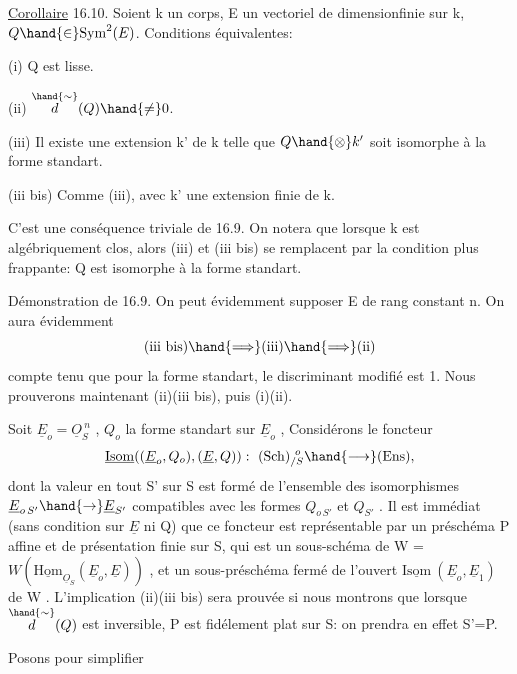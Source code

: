 \uline{Corollaire} 16.10. Soient k un corps, E un vectoriel de dimensionfinie
sur k, $Q \hand{\in} \mathrm{Sym}^2(E)$. Conditions équivalentes:

(i) Q est lisse.

(ii) $\overset{\hand{\sim}}{d}(Q) \hand{\neq} 0$.

(iii) Il existe une extension  k' de k telle que $Q\hand{\otimes} k'$ soit
isomorphe à la forme standart.

(iii bis) Comme (iii), avec k' une extension finie de k.

C'est une conséquence triviale de 16.9. On notera que lorsque k est
algébriquement clos, alors (iii) et (iii bis) se remplacent par la
condition plus frappante: Q est isomorphe à la forme standart.

Démonstration de 16.9. On  peut évidemment
supposer E de rang constant n. On aura évidemment
\[ \text{(iii bis)} \hand{\Longrightarrow} \text{(iii)} \hand{\Longrightarrow} \text{(ii)} \]
compte tenu que pour la forme standart, le discriminant modifié est 1.
Nous prouverons maintenant (ii)\hand{$\Longrightarrow$}(iii bis), puis (i)\hand{$\Longleftrightarrow$}(ii).

Soit $\underline{E}_o = \underline{O}_S^{\ n}$ , $Q_o$ la forme standart sur $\underline{E}_o$ , Considérons le
foncteur
\[ \underline{\mathrm{Isom}}( (\underline{E}_o,Q_o),(\underline{E},Q)) :\ (\mathrm{Sch})_{/S}^{\ o} \hand{\longrightarrow} (\mathrm{Ens}) , \]
dont la valeur en tout S' sur S est formé de l'ensemble des isomorphismes
$\underline{E}_{o\,S'} \hand{\to} \underline{E}_{S'}$ compatibles avec les formes $Q_{o\,S'}$ et $Q_{S'}$ . Il est immédiat
(sans condition sur $\underline{E}$ ni Q) que ce foncteur est représentable par un préschéma
P affine et de présentation finie sur S, qui est un sous-schéma de W =
$W(\underline{\mathrm{Hom}}_{\underline{O}_S}(\underline{E}_o,\underline{E}))$ , et un sous-préschéma fermé de  l'ouvert
$\underline{\mathrm{Isom}}\ (\underline{E}_o,\underline{E}_1)$ de W \hand{/}. L'implication (ii)\hand{$\Longrightarrow$}(iii bis) sera prouvée si
nous montrons que lorsque $\overset{\hand{\sim}}{d}(Q)$ est inversible, P est fidélement plat
sur S: on prendra en effet S'=P.

Posons pour simplifier 


